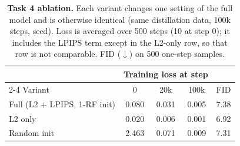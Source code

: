 \begin{table}[t]
  \centering
  \footnotesize
  \setlength{\tabcolsep}{3pt}
  \caption{\textbf{Task 4 ablation.} Each variant changes one setting of the full model and is otherwise identical (same distillation data, 100k steps, seed). Loss is averaged over 500 steps (10 at step 0); it includes the LPIPS term except in the L2-only row, so that row is not comparable. FID ($\downarrow$) on 500 one-step samples.}
  \label{tab:ablation}
  \begin{tabular}{@{}lcccc@{}}
    \toprule
    & \multicolumn{3}{c}{Training loss at step} & \\
    \cmidrule(lr){2-4}
    Variant & 0 & 20k & 100k & FID \\
    \midrule
    Full (L2 + LPIPS, 1-RF init) & 0.080 & 0.031 & 0.005 & 7.38 \\
    L2 only                      & 0.020 & 0.006 & 0.001 & 6.92 \\
    Random init                  & 2.463 & 0.071 & 0.009 & 7.31 \\
    \bottomrule
  \end{tabular}
\end{table}
